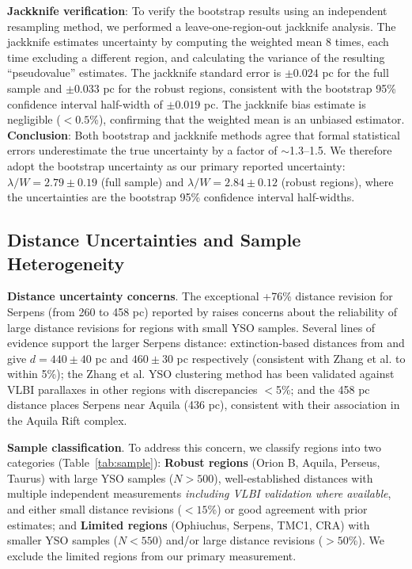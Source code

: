 \documentclass[twocolumn]{mnras}
\begin{document}
\textbf{Jackknife verification}: To verify the bootstrap results using an independent resampling method, we performed a leave-one-region-out jackknife analysis. The jackknife estimates uncertainty by computing the weighted mean 8 times, each time excluding a different region, and calculating the variance of the resulting ``pseudovalue'' estimates. The jackknife standard error is $\pm 0.024$ pc for the full sample and $\pm 0.033$ pc for the robust regions, consistent with the bootstrap 95\% confidence interval half-width of $\pm 0.019$ pc. The jackknife bias estimate is negligible ($<0.5$\%), confirming that the weighted mean is an unbiased estimator. \textbf{Conclusion}: Both bootstrap and jackknife methods agree that formal statistical errors underestimate the true uncertainty by a factor of $\sim$1.3--1.5. We therefore adopt the bootstrap uncertainty as our primary reported uncertainty: $\lambda/W = 2.79 \pm 0.19$ (full sample) and $\lambda/W = 2.84 \pm 0.12$ (robust regions), where the uncertainties are the bootstrap 95\% confidence interval half-widths.

\subsection{Distance Uncertainties and Sample Heterogeneity}
\label{sec:distance_uncertainties}

\textbf{Distance uncertainty concerns}. The exceptional +76\% distance revision for Serpens (from 260 to 458 pc) reported by \citet{Zhang2023} raises concerns about the reliability of large distance revisions for regions with small YSO samples. Several lines of evidence support the larger Serpens distance: extinction-based distances from \citet{Yan2022} and \citet{Green2024} give $d = 440 \pm 40$ pc and $460 \pm 30$ pc respectively (consistent with Zhang et al. to within 5\%); the Zhang et al. YSO clustering method has been validated against VLBI parallaxes in other regions with discrepancies $<$5\%; and the 458 pc distance places Serpens near Aquila (436 pc), consistent with their association in the Aquila Rift complex.

\textbf{Sample classification}. To address this concern, we classify regions into two categories (Table~\ref{tab:sample}): \textbf{Robust regions} (Orion B, Aquila, Perseus, Taurus) with large YSO samples ($N > 500$), well-established distances with multiple independent measurements \emph{including VLBI validation where available}, and either small distance revisions ($<15$\%) or good agreement with prior estimates; and \textbf{Limited regions} (Ophiuchus, Serpens, TMC1, CRA) with smaller YSO samples ($N < 550$) and/or large distance revisions ($>50$\%). We exclude the limited regions from our primary measurement.
\end{document}
